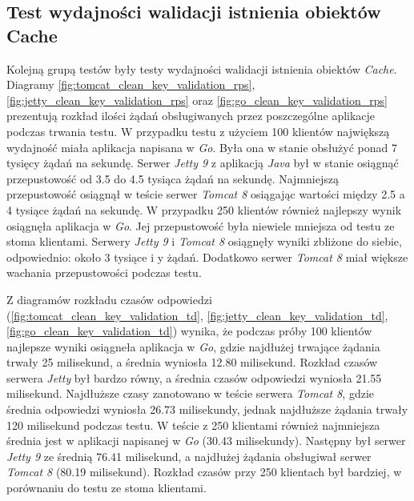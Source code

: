 

\clearpage

\subsection{Test wydajności walidacji istnienia obiektów Cache}
Kolejną grupą testów były testy wydajności walidacji istnienia obiektów \textsl{Cache}. Diagramy \ref{fig:tomcat_clean_key_validation_rps},  \ref{fig:jetty_clean_key_validation_rps} oraz  \ref{fig:go_clean_key_validation_rps} prezentują rozkład ilości żądań obsługiwanych przez poszczególne aplikacje podczas trwania testu. W przypadku testu z użyciem 100 klientów największą wydajność miała aplikacja napisana w \textsl{Go}. Była ona w stanie obsłużyć ponad 7 tysięcy żądań na sekundę. Serwer \textsl{Jetty 9} z aplikacją \textsl{Java} był w stanie osiągnąć przepustowość od 3.5 do 4.5 tysiąca żądań na sekundę. Najmniejszą przepustowość osiągnął w teście serwer \textsl{Tomcat 8} osiągając wartości między 2.5 a 4 tysiące żądań na sekundę. W przypadku 250 klientów również najlepszy wynik osiągnęła aplikacja w \textsl{Go}. Jej przepustowość była niewiele mniejsza od testu ze stoma klientami. Serwery \textsl{Jetty 9} i \textsl{Tomcat 8} osiągnęły wyniki zbliżone do siebie, odpowiednio: około 3 tysiące i y żądań. Dodatkowo serwer \textsl{Tomcat 8} miał większe wachania przepustowości podczas testu.

Z diagramów rozkładu czasów odpowiedzi (\ref{fig:tomcat_clean_key_validation_td},  \ref{fig:jetty_clean_key_validation_td}, \ref{fig:go_clean_key_validation_td}) wynika, że podczas próby 100 klientów najlepsze wyniki osiągneła aplikacja w \textsl{Go}, gdzie najdłużej trwające żądania trwały 25 milisekund, a średnia wyniosła 12.80 milisekund. Rozkład czasów serwera \textsl{Jetty} był bardzo równy, a średnia czasów odpowiedzi wyniosła 21.55 milisekund. Najdłuższe czasy zanotowano w teście serwera \textsl{Tomcat 8}, gdzie średnia odpowiedzi wyniosła 26.73 milisekundy, jednak najdłuższe żądania trwały 120 milisekund podczas testu. W teście z 250 klientami również najmniejsza średnia jest w aplikacji napisanej w \textsl{Go} (30.43 milisekundy). Następny był serwer \textsl{Jetty 9} ze średnią 76.41 milisekund, a najdłużej żądania obsługiwał serwer \textsl{Tomcat 8} (80.19 milisekund). Rozkład czasów przy 250 klientach był bardziej, w porównaniu do testu ze stoma klientami.

